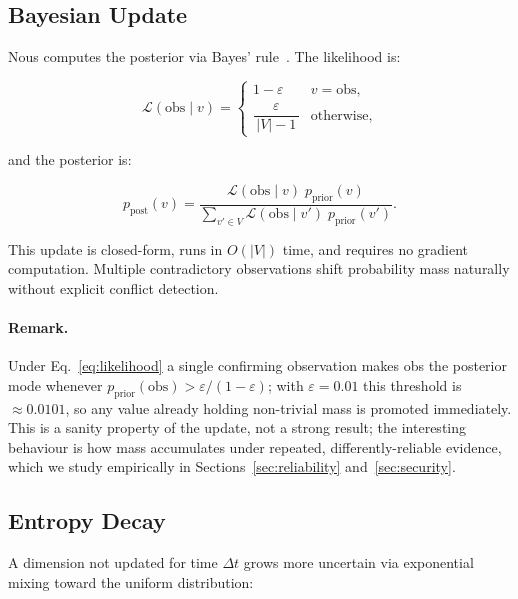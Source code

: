 \documentclass[11pt,a4paper,twocolumn]{article}
\begin{document}
\subsection{Bayesian Update}

Nous computes the posterior via Bayes' rule~\citep{bayes1763}. The likelihood
is:

\begin{equation}
  \mathcal{L}(\text{obs} \mid v) =
  \begin{cases}
    1 - \varepsilon & v = \text{obs}, \\[4pt]
    \dfrac{\varepsilon}{\,|V|-1\,} & \text{otherwise,}
  \end{cases}
  \label{eq:likelihood}
\end{equation}

and the posterior is:

\begin{equation}
  p_{\mathrm{post}}(v) =
  \frac{\mathcal{L}(\text{obs} \mid v)\; p_{\mathrm{prior}}(v)}
       {\displaystyle\sum_{v' \in V}
        \mathcal{L}(\text{obs} \mid v')\; p_{\mathrm{prior}}(v')}.
  \label{eq:bayes}
\end{equation}

This update is closed-form, runs in $O(|V|)$ time, and requires no gradient
computation. Multiple contradictory observations shift probability mass
naturally without explicit conflict detection.

\paragraph{Remark.}
Under Eq.~\eqref{eq:likelihood} a single confirming observation makes obs the
posterior mode whenever
$p_{\mathrm{prior}}(\text{obs}) > \varepsilon / (1 - \varepsilon)$; with
$\varepsilon = 0.01$ this threshold is $\approx 0.0101$, so any value already
holding non-trivial mass is promoted immediately. This is a sanity property of the
update, not a strong result; the interesting behaviour is how mass accumulates
under repeated, differently-reliable evidence, which we study empirically in
Sections~\ref{sec:reliability} and~\ref{sec:security}.

\subsection{Entropy Decay}

A dimension not updated for time $\Delta t$ grows more uncertain via
exponential mixing toward the uniform distribution:
\end{document}
